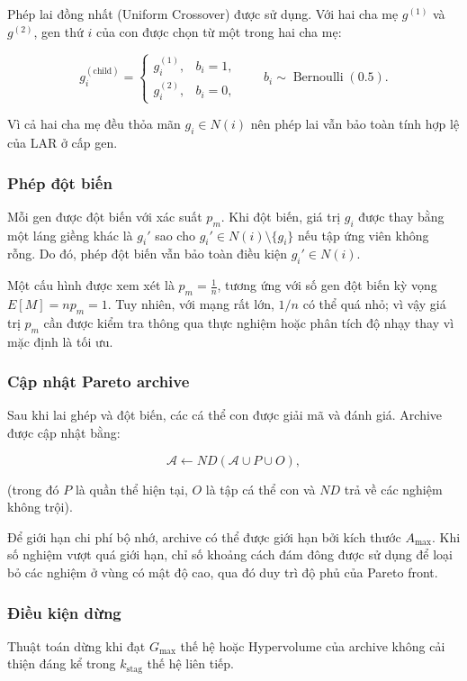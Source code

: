 \documentclass[14pt,a4paper]{extarticle}
\begin{document}
Phép lai đồng nhất (Uniform Crossover) được sử dụng. Với hai cha mẹ $g^{(1)}$ và $g^{(2)}$, gen thứ $i$ của con được chọn từ một trong hai cha mẹ:

\[
g_i^{(\mathrm{child})}
=
\begin{cases}
g_i^{(1)}, & b_i=1,\\
g_i^{(2)}, & b_i=0,
\end{cases}
\qquad
b_i\sim\operatorname{Bernoulli}(0.5).
\]

Vì cả hai cha mẹ đều thỏa mãn $g_i\in N(i)$ nên phép lai vẫn bảo toàn tính hợp lệ của LAR ở cấp gen.

\subsubsection{Phép đột biến}

Mỗi gen được đột biến với xác suất $p_m$. Khi đột biến, giá trị $g_i$ được thay bằng một láng giềng khác là $g_i'$ sao cho
$
g_i'\in N(i)\setminus\{g_i\}
$ nếu tập ứng viên không rỗng. Do đó, phép đột biến vẫn bảo toàn điều kiện $g_i'\in N(i)$.

Một cấu hình được xem xét là $
p_m=\frac{1}{n}
$, tương ứng với số gen đột biến kỳ vọng 
$
E[M]=np_m=1
$. Tuy nhiên, với mạng rất lớn, $1/n$ có thể quá nhỏ; vì vậy giá trị $p_m$ cần được kiểm tra thông qua thực nghiệm hoặc phân tích độ nhạy thay vì mặc định là tối ưu.

\subsubsection{Cập nhật Pareto archive}

Sau khi lai ghép và đột biến, các cá thể con được giải mã và đánh giá. Archive được cập nhật bằng:

\[
\mathcal A
\leftarrow
ND(\mathcal A\cup P\cup O),
\]

(trong đó $P$ là quần thể hiện tại, $O$ là tập cá thể con và $ND$ trả về các nghiệm không trội).

Để giới hạn chi phí bộ nhớ, archive có thể được giới hạn bởi kích thước $A_{\max}$. Khi số nghiệm vượt quá giới hạn, chỉ số khoảng cách đám đông được sử dụng để loại bỏ các nghiệm ở vùng có mật độ cao, qua đó duy trì độ phủ của Pareto front.

\subsubsection{Điều kiện dừng}

Thuật toán dừng khi đạt $G_{\max}$ thế hệ hoặc Hypervolume của archive không cải thiện đáng kể trong $k_{\mathrm{stag}}$ thế hệ liên tiếp.
\end{document}
